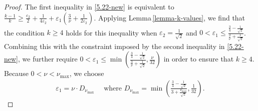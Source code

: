 \documentclass{article}
\theoremstyle{definition}                   %
\begin{document}
\begin{proof}
%
The first inequality in \eqref{5.22-new} is equivalent to
$\frac{k-1}{k} \ge \frac{\varepsilon_2}{2} + 
\frac{1}{4\varepsilon_2} + \varepsilon_1
 \left( \frac{3}{\nu} + \frac{1}{2\varepsilon_2} \right)$. Applying Lemma\,\ref{lemma-k-values}, we find that the condition $k\ge 4$ holds for this inequality when 
$\varepsilon_2=\frac{1}{\sqrt{2}}$ and 
 $0<\varepsilon_1\le \frac{\frac{3}{4} - \frac{1}{\sqrt{2}}}{\frac{3}{\nu} + \frac{1}{\sqrt{2}}}$. Combining this with the constraint imposed by the second inequality in \eqref{5.22-new}, we further require $0<\varepsilon_1  \le \min\left( 
 \frac{\frac{3}{4} - \frac{1}{\sqrt{2}}}{\frac{3}{\nu} + \frac{1}{\sqrt{2}}}, \frac{\nu}{32} \right)$ in order to ensure that $k\ge 4$. Because $0<\nu<\nu_{\max}$, we choose 
\begin{align}
\varepsilon_1=\nu \cdot D_{\nu_{\max}}
\quad
\text{ where }
D_{\nu_{\max}}= \min\left( 
 \frac{\frac{3}{4} - \frac{1}{\sqrt{2}}}{3 + \frac{\nu_{\max}}{\sqrt{2}}}, \frac{1}{32} \right).
\label{eps1_def}
\end{align}


\end{proof}
\end{document}
